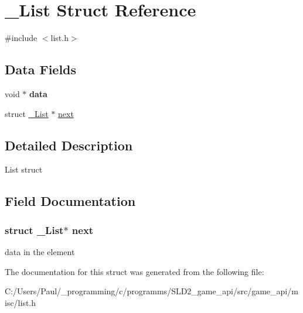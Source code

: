\hypertarget{struct___list}{\section{\+\_\+\+List Struct Reference}
\label{struct___list}
}


{\ttfamily \#include $<$list.\+h$>$}

\subsection*{Data Fields}
\begin{DoxyCompactItemize}
\item 
\hypertarget{struct___list_a735984d41155bc1032e09bece8f8d66d}{void $\ast$ {\bfseries data}}\label{struct___list_a735984d41155bc1032e09bece8f8d66d}

\item 
struct \hyperlink{struct___list}{\+\_\+\+List} $\ast$ \hyperlink{struct___list_a81debf80d483b20cf92dc02b1e43c3a4}{next}
\end{DoxyCompactItemize}


\subsection{Detailed Description}
List struct 

\subsection{Field Documentation}
\hypertarget{struct___list_a81debf80d483b20cf92dc02b1e43c3a4}{
\subsubsection[{next}]{\setlength{\rightskip}{0pt plus 5cm}struct {\bf \+\_\+\+List}$\ast$ next}}\label{struct___list_a81debf80d483b20cf92dc02b1e43c3a4}
data in the element 

The documentation for this struct was generated from the following file\+:\begin{DoxyCompactItemize}
\item 
C\+:/\+Users/\+Paul/\+\_\+programming/c/programms/\+S\+L\+D2\+\_\+game\+\_\+api/src/game\+\_\+api/misc/list.\+h\end{DoxyCompactItemize}
